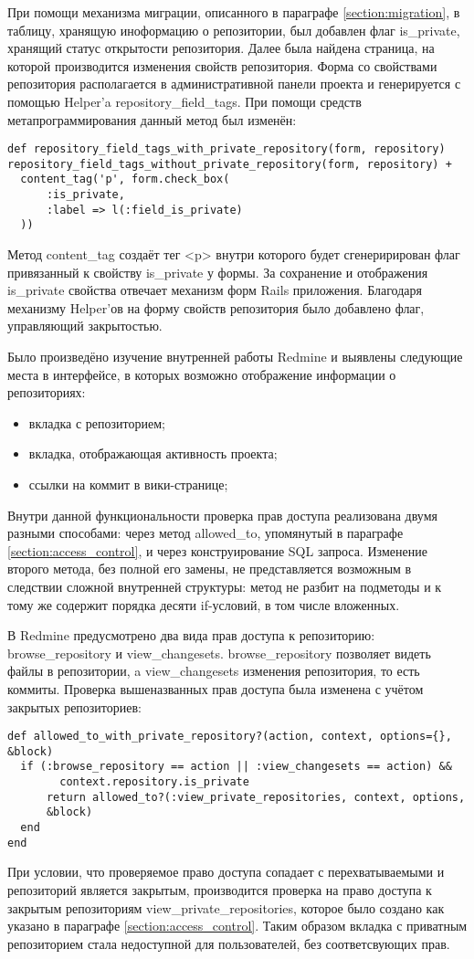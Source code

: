 При помощи механизма миграции, описанного в параграфе \ref{section:migration},
в таблицу, хранящую иноформацию о репозитории, был добавлен флаг is\_private,
хранящий статус открытости репозитория. Далее была найдена страница, на которой
производится изменения свойств репозитория. Форма со свойствами репозитория
располагается в административной панели проекта и генерируется с помощью
Helper'a repository\_field\_tags. При помощи средств метапрограммирования
данный метод был изменён:
\small{\begin{lstlisting}
def repository_field_tags_with_private_repository(form, repository)
repository_field_tags_without_private_repository(form, repository) +
  content_tag('p', form.check_box(
      :is_private,
      :label => l(:field_is_private)
  ))
\end{lstlisting}}
Метод content\_tag создаёт тег <p> внутри которого будет
сгенеририрован флаг привязанный к свойству is\_private у формы. За сохранение и
отображения is\_private свойства отвечает механизм форм Rails приложения.
Благодаря механизму Helper'ов на форму свойств репозитория было добавлено
флаг, управляющий закрытостью.

Было произведёно изучение внутренней работы Redmine и выявлены следующие места
в интерфейсе, в которых возможно отображение информации о репозиториях:
\begin{itemize}
  \item вкладка с репозиторием;
  \item вкладка, отображающая активность проекта;
  \item ссылки на коммит в вики-странице;
\end{itemize}
Внутри данной функциональности проверка прав доступа реализована двумя разными
способами: через метод allowed\_to, упомянутый в параграфе
\ref{section:access_control}, и через конструирование SQL запроса. Изменение
второго метода, без полной его замены, не представляется возможным в следствии
сложной внутренней структуры: метод не разбит на подметоды и к тому же
содержит порядка десяти if-условий, в том числе вложенных. 

В Redmine предусмотрено два вида прав доступа к репозиторию:
browse\_repository и view\_changesets. browse\_repository позволяет видеть
файлы в репозитории, a view\_changesets изменения репозитория, то есть коммиты.
Проверка вышеназванных прав доступа была изменена с учётом закрытых
репозиториев:
\small{\begin{lstlisting}
def allowed_to_with_private_repository?(action, context, options={}, &block)
  if (:browse_repository == action || :view_changesets == action) &&
        context.repository.is_private 
      return allowed_to?(:view_private_repositories, context, options,
      &block)       
  end
end
\end{lstlisting}}
При условии, что проверяемое право доступа сопадает с перехватываемыми и
репозиторий является закрытым, производится проверка на право доступа к
закрытым репозиториям view\_private\_repositories, которое было создано как
указано в параграфе \ref{section:access_control}. Таким образом вкладка с
приватным репозиторием стала недоступной для пользователей, без соответсвующих
прав.



